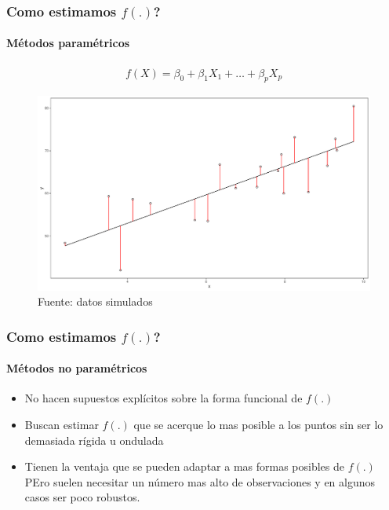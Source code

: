 \documentclass[
  shownotes,
  xcolor={svgnames},
  hyperref={colorlinks,citecolor=DarkBlue,linkcolor=DarkRed,urlcolor=DarkBlue}
  , aspectratio=169]{beamer}
\begin{document}

\begin{frame}
\frametitle{Como estimamos $f(.)$?}
\framesubtitle{Métodos paramétricos}

\begin{align}
   f(X) = \beta_0 + \beta_1 X_1 + \dots + \beta_p X_p 
\end{align}

\begin{figure}[H] \centering
  \centering
  \includegraphics[scale=0.2]{figures/fig_1b.pdf}
  \\
  \tiny
  Fuente: datos simulados
\end{figure}

\end{frame}

\begin{frame}
\frametitle{Como estimamos $f(.)$?}
\framesubtitle{Métodos no paramétricos}
\begin{itemize}
\item No hacen supuestos explícitos sobre la forma funcional de $f(.)$
\medskip
\item Buscan estimar $f(.)$ que se acerque lo mas posible a los puntos sin ser lo demasiada rígida u ondulada
\medskip
\item Tienen la ventaja que se pueden adaptar a mas formas posibles de $f(.)$
\medskip
PEro suelen necesitar un número mas alto de observaciones y en algunos casos ser poco robustos.
\end{itemize}

\end{frame}
\end{document}
